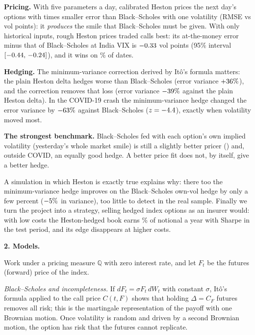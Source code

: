 \documentclass[10pt,leqno]{amsart}
\newcommand{\heading}[1]{\medskip\noindent\textbf{#1}\par}
\newcommand{\Q}{\mathbb{Q}}
\begin{document}
\begin{compactitem}
\item \textbf{Pricing.} With five parameters a day, calibrated Heston prices the next day's options with \PriceFlatOverHeston{} times smaller error than Black--Scholes with one volatility (RMSE \PriceHestonAll{} vs \PriceBSAtmAll{} vol points): it \emph{produces} the smile that Black--Scholes must be given. With only historical inputs, rough Heston prices traded calls best: its at-the-money error minus that of Black--Scholes at India VIX is $-0.33$ vol points (95\% interval $[-0.44,\,-0.24]$), and it wins on \TSRoughWinPct\% of dates.
\item \textbf{Hedging.} The minimum-variance correction derived by Itô's formula matters: the plain Heston delta hedges worse than Black--Scholes (error variance $+36\%$), and the correction removes that loss (error variance $-39\%$ against the plain Heston delta). In the COVID-19 crash the minimum-variance hedge changed the error variance by $-63\%$ against Black--Scholes ($z=-4.4$), exactly when volatility moved most.
\item \textbf{The strongest benchmark.} Black--Scholes fed with each option's own implied volatility (yesterday's whole market smile) is still a slightly better pricer (\PriceBSOwnAll{}) and, outside COVID, an equally good hedge. A better price fit does not, by itself, give a better hedge.
\end{compactitem} A simulation in which Heston is exactly true explains why: there too the minimum-variance hedge improves on the Black--Scholes own-vol hedge by only a few percent ($-5\%$ in variance), too little to detect in the real sample. Finally we turn the project into a strategy, selling hedged index options as an insurer would: with low costs the Heston-hedged book earns \StratMVRet\% of notional a year with Sharpe \StratMVSharpe{} in the test period, and its edge disappears at higher costs.

\heading{2. Models.}
\noindent Work under a pricing measure $\Q$ with zero interest rate, and let $F_t$ be the futures (forward) price of the index.

\emph{Black--Scholes and incompleteness.} If $dF_t=\sigma F_t\,dW_t$ with constant $\sigma$, Itô's formula applied to the call price $C(t,F)$ shows that holding $\Delta=C_F$ futures removes all risk; this is the martingale representation of the payoff with one Brownian motion. Once volatility is random and driven by a second Brownian motion, the option has risk that the futures cannot replicate.
\end{document}
